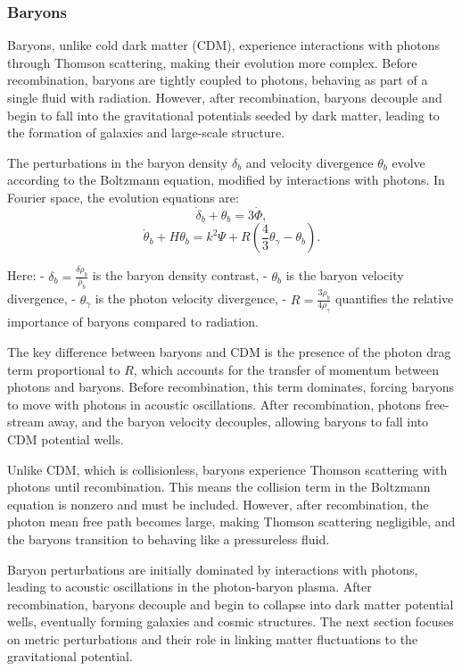 \documentclass{aa}
\begin{document}
\subsubsection{Baryons}
\color{Plum}
Baryons, unlike cold dark matter (CDM), experience interactions with photons through Thomson scattering, making their evolution more complex. Before recombination, baryons are tightly coupled to photons, behaving as part of a single fluid with radiation. However, after recombination, baryons decouple and begin to fall into the gravitational potentials seeded by dark matter, leading to the formation of galaxies and large-scale structure.

The perturbations in the baryon density $\delta_b$ and velocity divergence $\theta_b$ evolve according to the Boltzmann equation, modified by interactions with photons. In Fourier space, the evolution equations are:
\begin{equation}
\dot{\delta}_b + \theta_b = 3\dot{\Phi},
\end{equation}
\begin{equation}
\dot{\theta}_b + H \theta_b = k^2 \Psi + R \left( \frac{4}{3} \theta_\gamma - \theta_b \right).
\end{equation}

Here:
- $\delta_b = \frac{\delta\rho_b}{\bar{\rho}_b}$ is the baryon density contrast,
- $\theta_b$ is the baryon velocity divergence,
- $\theta_\gamma$ is the photon velocity divergence,
- $R = \frac{3\rho_b}{4\rho_\gamma}$ quantifies the relative importance of baryons compared to radiation.

The key difference between baryons and CDM is the presence of the photon drag term proportional to $R$, which accounts for the transfer of momentum between photons and baryons. Before recombination, this term dominates, forcing baryons to move with photons in acoustic oscillations. After recombination, photons free-stream away, and the baryon velocity decouples, allowing baryons to fall into CDM potential wells.

Unlike CDM, which is collisionless, baryons experience Thomson scattering with photons until recombination. This means the collision term in the Boltzmann equation is nonzero and must be included. However, after recombination, the photon mean free path becomes large, making Thomson scattering negligible, and the baryons transition to behaving like a pressureless fluid.

Baryon perturbations are initially dominated by interactions with photons, leading to acoustic oscillations in the photon-baryon plasma. After recombination, baryons decouple and begin to collapse into dark matter potential wells, eventually forming galaxies and cosmic structures. The next section focuses on metric perturbations and their role in linking matter fluctuations to the gravitational potential.
\color{black}
\end{document}
